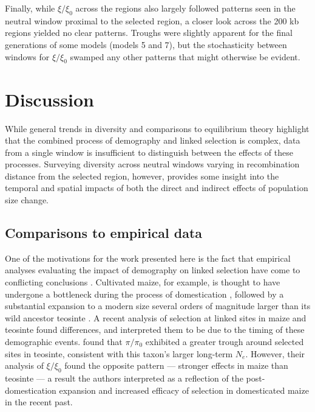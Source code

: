 \documentclass[9pt,twocolumn,twoside]{rilabRxiv}
\begin{document}
Finally, while  $\xi/\xi_0$ across the regions also largely followed patterns seen in the neutral window proximal to the selected region, a closer look across the 200 kb regions yielded no clear patterns. 
Troughs were slightly apparent for the final generations of some models (models 5 and 7), but the stochasticity between windows for $\xi/\xi_0$ swamped any other patterns that might otherwise be evident.

\section{Discussion}


While general trends in diversity and comparisons to equilibrium theory highlight that the combined process of demography and linked selection is complex, data from a single window is insufficient to distinguish between the effects of these processes.
Surveying diversity across neutral windows varying in recombination distance from the selected region, however, provides some insight into the temporal and spatial impacts of both the direct and indirect effects of population size change. 



\subsection{Comparisons to empirical data}

One of the motivations for the work presented here is the fact that empirical analyses evaluating the impact of demography on linked selection have come to conflicting conclusions \citep{torres2018human, beissinger2016recent}.
Cultivated maize, for example, is thought to have undergone a bottleneck during the process of domestication \citep{eyre1998investigation,tenaillon2004selection,wright2005effects}, followed by a substantial expansion to a modern size several orders of magnitude larger than its wild ancestor teosinte \citep{beissinger2016recent, bellon2018evolutionary}.
A recent analysis of selection at linked sites in  maize and teosinte found differences, and interpreted them to be due to the timing of these demographic events.
\citet{beissinger2016recent} found that $\pi/\pi_0$ exhibited a greater trough around selected sites in teosinte, consistent with this taxon's larger long-term $N_e$.
However, their analysis of $\xi/\xi_0$ found the opposite pattern --- stronger effects in maize than teosinte --- a result the authors interpreted as a reflection of the post-domestication expansion and increased efficacy of selection in domesticated maize in the recent past.
\end{document}
